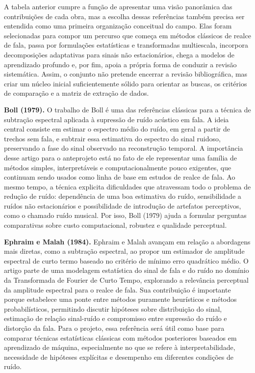 A tabela anterior cumpre a função de apresentar uma visão panorâmica das contribuições de cada obra, mas a escolha dessas referências também precisa ser entendida como uma primeira organização conceitual do campo. Elas foram selecionadas para compor um percurso que começa em métodos clássicos de realce de fala, passa por formulações estatísticas e transformadas multiescala, incorpora decomposições adaptativas para sinais não estacionários, chega a modelos de aprendizado profundo e, por fim, apoia a própria forma de conduzir a revisão sistemática. Assim, o conjunto não pretende encerrar a revisão bibliográfica, mas criar um núcleo inicial suficientemente sólido para orientar as buscas, os critérios de comparação e a matriz de extração de dados.

\noindent\textbf{Boll (1979).} O trabalho de Boll é uma das referências clássicas para a técnica de subtração espectral aplicada à supressão de ruído acústico em fala. A ideia central consiste em estimar o espectro médio do ruído, em geral a partir de trechos sem fala, e subtrair essa estimativa do espectro do sinal ruidoso, preservando a fase do sinal observado na reconstrução temporal. A importância desse artigo para o anteprojeto está no fato de ele representar uma família de métodos simples, interpretáveis e computacionalmente pouco exigentes, que continuam sendo usados como linha de base em estudos de realce de fala. Ao mesmo tempo, a técnica explicita dificuldades que atravessam todo o problema de redução de ruído: dependência de uma boa estimativa do ruído, sensibilidade a ruídos não estacionários e possibilidade de introdução de artefatos perceptivos, como o chamado ruído musical. Por isso, Boll (1979) ajuda a formular perguntas comparativas sobre custo computacional, robustez e qualidade perceptual.

\noindent\textbf{Ephraim e Malah (1984).} Ephraim e Malah avançam em relação a abordagens mais diretas, como a subtração espectral, ao propor um estimador de amplitude espectral de curto termo baseado no critério de mínimo erro quadrático médio. O artigo parte de uma modelagem estatística do sinal de fala e do ruído no domínio da Transformada de Fourier de Curto Tempo, explorando a relevância perceptual da amplitude espectral para o realce de fala. Sua contribuição é importante porque estabelece uma ponte entre métodos puramente heurísticos e métodos probabilísticos, permitindo discutir hipóteses sobre distribuição do sinal, estimação de relação sinal-ruído e compromisso entre supressão do ruído e distorção da fala. Para o projeto, essa referência será útil como base para comparar técnicas estatísticas clássicas com métodos posteriores baseados em aprendizado de máquina, especialmente no que se refere à interpretabilidade, necessidade de hipóteses explícitas e desempenho em diferentes condições de ruído.

